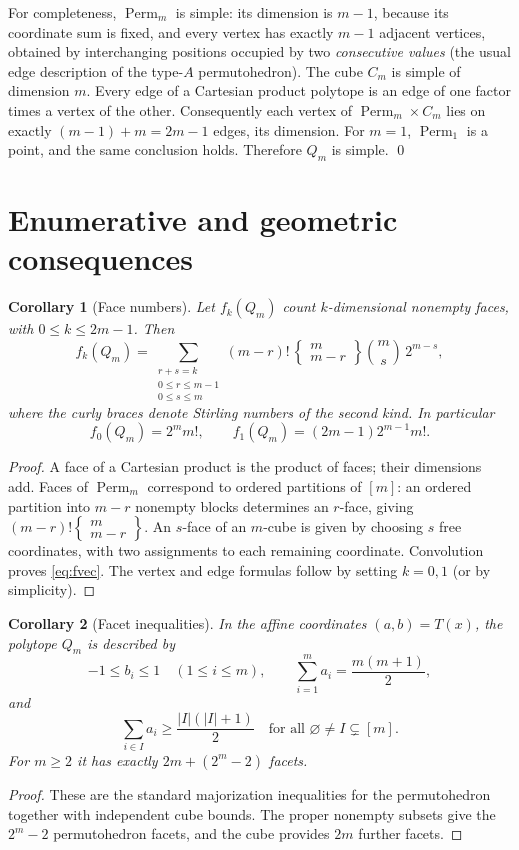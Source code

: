\documentclass[11pt]{article}
\newtheorem{corollary}{Corollary}
\newcommand{\Perm}{\operatorname{Perm}}
\begin{document}
For completeness, $\Perm_m$ is simple: its dimension is $m-1$, because its coordinate sum is fixed, and every vertex has exactly $m-1$ adjacent vertices, obtained by interchanging positions occupied by two \emph{consecutive values} (the usual edge description of the type-$A$ permutohedron). The cube $C_m$ is simple of dimension $m$. Every edge of a Cartesian product polytope is an edge of one factor times a vertex of the other. Consequently each vertex of $\Perm_m\times C_m$ lies on exactly $(m-1)+m=2m-1$ edges, its dimension. For $m=1$, $\Perm_1$ is a point, and the same conclusion holds. Therefore $Q_m$ is simple. \qed

\section{Enumerative and geometric consequences}
\begin{corollary}[Face numbers]\label{cor:faces}
Let $f_k(Q_m)$ count $k$-dimensional nonempty faces, with $0\le k\le 2m-1$. Then
\begin{equation}\label{eq:fvec}
f_k(Q_m)=\sum_{\substack{r+s=k\\0\le r\le m-1\\0\le s\le m}} (m-r)!\,\left\{\begin{matrix}m\\m-r\end{matrix}\right\}\binom{m}{s}\,2^{m-s},
\end{equation}
where the curly braces denote Stirling numbers of the second kind. In particular
\[f_0(Q_m)=2^m m!,\qquad f_1(Q_m)=(2m-1)2^{m-1}m!.\]
\end{corollary}
\begin{proof}
A face of a Cartesian product is the product of faces; their dimensions add. Faces of $\Perm_m$ correspond to ordered partitions of $[m]$: an ordered partition into $m-r$ nonempty blocks determines an $r$-face, giving $(m-r)!\left\{\begin{smallmatrix}m\\m-r\end{smallmatrix}\right\}$. An $s$-face of an $m$-cube is given by choosing $s$ free coordinates, with two assignments to each remaining coordinate. Convolution proves \eqref{eq:fvec}. The vertex and edge formulas follow by setting $k=0,1$ (or by simplicity).\end{proof}

\begin{corollary}[Facet inequalities]\label{cor:facets}
In the affine coordinates $(a,b)=T(x)$, the polytope $Q_m$ is described by
\[ -1\le b_i\le1\quad(1\le i\le m),\qquad
\sum_{i=1}^m a_i=\frac{m(m+1)}2,\]
and
\[\sum_{i\in I}a_i\ge \frac{|I|(|I|+1)}2 \quad\text{for all }\varnothing\ne I\subsetneq[m].\]
For $m\ge2$ it has exactly $2m+(2^m-2)$ facets.
\end{corollary}
\begin{proof}
These are the standard majorization inequalities for the permutohedron together with independent cube bounds. The proper nonempty subsets give the $2^m-2$ permutohedron facets, and the cube provides $2m$ further facets.\end{proof}
\end{document}
